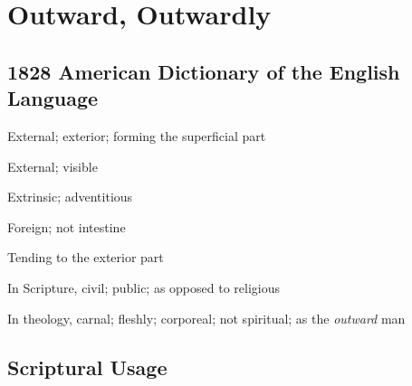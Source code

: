 \section{Outward, Outwardly}
	\label{OUTWARD}
	

\subsection{1828 American Dictionary of the English Language} %
	\label{OUTWARD-1828}

	\begin{compactitem}
		\item[1] External; exterior; forming the superficial part
		\item[2] External; visible
		\item[3] Extrinsic; adventitious
		\item[4] Foreign; not intestine
		\item[5] Tending to the exterior part
		\item[6] In Scripture, civil; public; as opposed to religious
		\item[7] In theology, carnal; fleshly; corporeal; not spiritual; as the \textit{outward} man
	\end{compactitem}



\subsection{Scriptural Usage} %
	\label{OUTWARD-SCRIPTURES}

